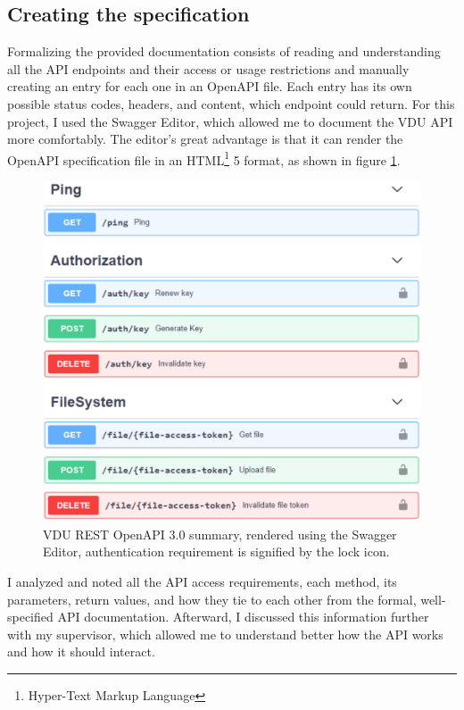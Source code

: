 \subsection*{Creating the specification}
Formalizing the provided documentation consists of reading and understanding all the API endpoints and their access or usage restrictions and manually creating an entry for each one in an OpenAPI file. Each entry has its own possible status codes, headers, and content, which endpoint could return. For this project, I used the Swagger Editor, which allowed me to document the VDU API more comfortably. The editor's great advantage is that it can render the OpenAPI specification file in an HTML\footnote{Hyper-Text Markup Language} 5 format, as shown in figure \ref{swagger_result}.

\begin{figure}[htb]
	\centering
	\includegraphics[width=\columnwidth]{obrazky-figures/swagger_result.pdf}
	\caption{VDU REST OpenAPI 3.0 summary, rendered using the Swagger Editor, authentication requirement is signified by the lock icon.}
	\label{swagger_result}
\end{figure}

I analyzed and noted all the API access requirements, each method, its parameters, return values, and how they tie to each other from the formal, well-specified API documentation. Afterward, I discussed this information further with my supervisor, which allowed me to understand better how the API works and how it should interact.

